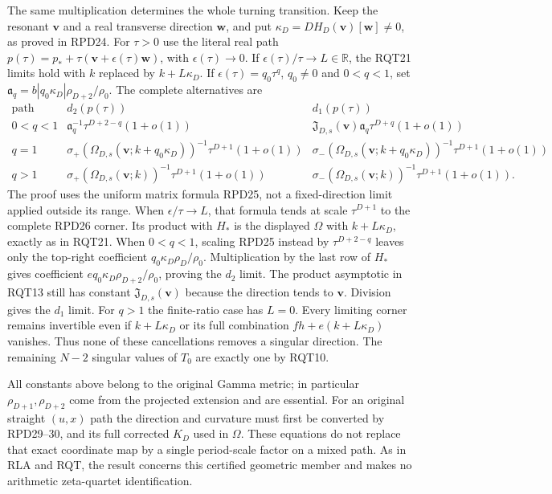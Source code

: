 The same multiplication determines the whole turning transition.
Keep the resonant $\mathbf v$ and a real transverse direction
$\mathbf w$, and put $\kappa_D=DH_D(\mathbf v)[\mathbf w]\ne0$,
as proved in RPD24.  For $\tau>0$ use the literal real path
$p(\tau)=p_*+\tau(\mathbf v+\epsilon(\tau)\mathbf w)$,
with $\epsilon(\tau)\to0$.
If $\epsilon(\tau)/\tau\to L\in\mathbb R$, the RQT21 limits
hold with $k$ replaced by $k+L\kappa_D$.
If $\epsilon(\tau)=q_0\tau^q$, $q_0\ne0$ and $0<q<1$, set
$\mathfrak a_q=b|q_0\kappa_D|\rho_{D+2}/\rho_0$.
The complete alternatives are
\[
 \begin{array}{c|c|c}
 \text{path}& d_2(p(\tau))&d_1(p(\tau))\\\hline
 0<q<1&
 \mathfrak a_q^{-1}\tau^{D+2-q}(1+o(1))&
 \mathfrak J_{D,s}(\mathbf v)\mathfrak a_q
                  \tau^{D+q}(1+o(1))\\[2pt]
 q=1&
 \sigma_+(\Omega_{D,s}(\mathbf v;k+q_0\kappa_D))^{-1}
                  \tau^{D+1}(1+o(1))&
 \sigma_-(\Omega_{D,s}(\mathbf v;k+q_0\kappa_D))^{-1}
                  \tau^{D+1}(1+o(1))\\[2pt]
 q>1&
 \sigma_+(\Omega_{D,s}(\mathbf v;k))^{-1}
                  \tau^{D+1}(1+o(1))&
 \sigma_-(\Omega_{D,s}(\mathbf v;k))^{-1}
                  \tau^{D+1}(1+o(1)).
 \end{array}\tag{RQT22}
\]
The proof uses the uniform matrix formula RPD25, not a
fixed-direction limit applied outside its range.  When
$\epsilon/\tau\to L$, that formula tends at scale $\tau^{D+1}$
to the complete RPD26 corner.  Its product with $H_*$ is the
displayed $\Omega$ with $k+L\kappa_D$, exactly as in RQT21.
When $0<q<1$, scaling RPD25 instead by $\tau^{D+2-q}$ leaves only
the top-right coefficient $q_0\kappa_D\rho_D/\rho_0$.
Multiplication by the last row of $H_*$ gives coefficient
$eq_0\kappa_D\rho_{D+2}/\rho_0$, proving the $d_2$ limit.
The product asymptotic in RQT13 still has constant
$\mathfrak J_{D,s}(\mathbf v)$ because the direction tends to
$\mathbf v$.  Division gives the $d_1$ limit.
For $q>1$ the finite-ratio case has $L=0$.
Every limiting corner remains invertible even if
$k+L\kappa_D$ or its full combination $fh+e(k+L\kappa_D)$
vanishes.  Thus none of these cancellations removes a singular
direction.  The remaining $N-2$ singular values of $T_0$ are
exactly one by RQT10.

All constants above belong to the original Gamma metric; in
particular $\rho_{D+1},\rho_{D+2}$ come from the projected extension
and are essential.  For an original straight $(u,x)$ path the
direction and curvature must first be converted by RPD29--30,
and its full corrected $K_D$ used in $\Omega$.  These equations
do not replace that exact coordinate map by a single period-scale
factor on a mixed path.  As in RLA and RQT, the result concerns
this certified geometric member and makes no arithmetic
zeta-quartet identification.
